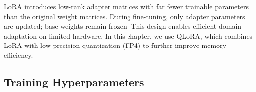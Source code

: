 LoRA introduces low-rank adapter matrices with far fewer trainable parameters than the original weight matrices. During fine-tuning, only adapter parameters are updated; base weights remain frozen. This design enables efficient domain adaptation on limited hardware. In this chapter, we use QLoRA, which combines LoRA with low-precision quantization (FP4) to further improve memory efficiency.



\subsection*{Training Hyperparameters}\label{ch2:sec:parameter}

